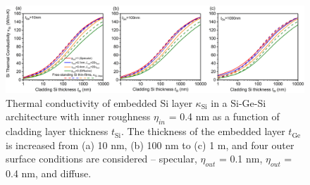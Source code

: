 \begin{figure}
  \centering \includegraphics[width=1.0\textwidth]{figures/ch5/Fig2-red.jpg}
  \caption{Thermal conductivity of embedded Si layer $\kappa_{\text{Si}}$ in a Si-Ge-Si architecture with inner roughness $\eta_{in}$ = 0.4 nm as a function of cladding layer thickness $t_{\text{Si}}$. The thickness of the embedded layer $t_{\text{Ge}}$ is increased from (a) 10 nm, (b) 100 nm to (c) 1 \si{\micro}m, and four outer surface conditions are considered -- specular, $\eta_{out}$ = 0.1 nm, $\eta_{out}$ = 0.4 nm, and diffuse.}
    \label{fig:ch5-red2}
\end{figure}

